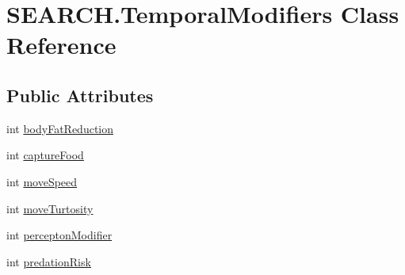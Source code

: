 \hypertarget{class_s_e_a_r_c_h_1_1_temporal_modifiers}{\section{S\-E\-A\-R\-C\-H.\-Temporal\-Modifiers Class Reference}
\label{class_s_e_a_r_c_h_1_1_temporal_modifiers}
}
\subsection*{Public Attributes}
\begin{DoxyCompactItemize}
\item 
int \hyperlink{class_s_e_a_r_c_h_1_1_temporal_modifiers_a792b00d4d518565252aa4963fd7595c4}{body\-Fat\-Reduction}
\item 
int \hyperlink{class_s_e_a_r_c_h_1_1_temporal_modifiers_a1b1d7d01c542f6b45fd1be5944fc0483}{capture\-Food}
\item 
int \hyperlink{class_s_e_a_r_c_h_1_1_temporal_modifiers_ab2ee566ad9f28ff631cb5384d3da0e45}{move\-Speed}
\item 
int \hyperlink{class_s_e_a_r_c_h_1_1_temporal_modifiers_aa290e2008609fd0568b1224cac3e2af5}{move\-Turtosity}
\item 
int \hyperlink{class_s_e_a_r_c_h_1_1_temporal_modifiers_afb6549fda216fb9ad82f311e4db2813e}{percepton\-Modifier}
\item 
int \hyperlink{class_s_e_a_r_c_h_1_1_temporal_modifiers_a28bc2a746df06ddf74ac9cc5946564fc}{predation\-Risk}
\end{DoxyCompactItemize}


